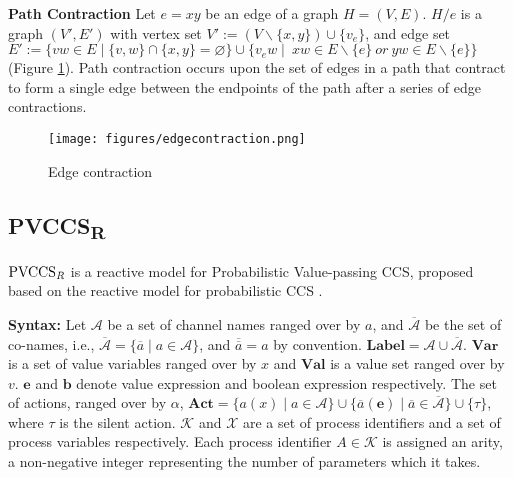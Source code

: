 \documentclass{acm_proc_article-sp}
\begin{document}
\textbf{Path Contraction}
Let $e=xy$ be an edge of a graph $H=(V,E)$. $H/e$ is a graph $(V',E')$ with vertex set $V':=(V\backslash \{x,y\})\cup \{v_{e}\}$, and edge set $E':=\{vw\in E\mid \{v,w\}\cap \{x,y\}=\varnothing\}\cup \{v_{e}w\mid ~xw\in E\backslash\{e\}~or~yw\in E\backslash \{e\}\}$ (Figure \ref{edgecontraction}). Path contraction occurs upon the set of edges in a path that contract to form a single edge between the endpoints of the path after a series of edge contractions.
\begin{figure}[htpb]
\begin{center}
\texttt{[image: figures/edgecontraction.png]}
\caption{Edge contraction}
\label{edgecontraction}
\end{center}
\end{figure}
\subsection{PVCCS\textsubscript{R}}
\newtheorem{definition}{Definition}[section]
\newtheorem{Theorem}{Theorem}[section]
\newtheorem{Lemma}{Lemma}[section]
$\rm{PVCCS_\textit{R}}$ is a reactive model for Probabilistic Value-passing CCS, proposed based on the reactive model for probabilistic CCS \cite{rob}.

\textbf{Syntax:}
Let $\mathbf{\mathcal{A}}$ be a set of channel names ranged over by $a$, and $\mathbf{\mathcal{\overline{A}}}$ be the set of co-names, i.e., $\mathbf{\mathcal{\overline{A}}}=\{\overline{a}\mid a\in \mathbf{\mathcal{A}}\}$, and $\overline{\overline{a}}=a$ by convention. $\mathbf{Label}=\mathcal{A} \cup \mathcal{\overline{A}}$. $\mathbf{Var}$ is a set of value variables ranged over by $x$ and $\mathbf{Val}$ is a value set ranged over by $v$. $\mathbf{e}$ and $\mathbf{b}$ denote value expression and boolean expression respectively. The set of actions, ranged over by $\alpha$, $\mathbf{Act}=\{a(x)\mid a\in \mathcal{A}\}\cup \{\overline{a}(\mathbf{e})\mid \overline{a}\in \mathcal{\overline{A}}\}\cup \{\tau \}$,  where $\tau$ is the silent action. $\mathbf{\mathcal{K}}$ and $\mathbf{\mathcal{X}}$ are a set of process identifiers and a set of process variables respectively. Each process identifier $A\in \mathcal{K}$ is assigned an arity, a non-negative integer representing the number of parameters which it takes.
\end{document}
